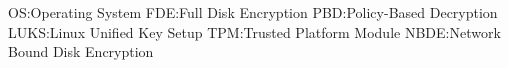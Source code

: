 OS:Operating System
FDE:Full Disk Encryption
PBD:Policy-Based Decryption
LUKS:Linux Unified Key Setup
TPM:Trusted Platform Module
NBDE:Network Bound Disk Encryption